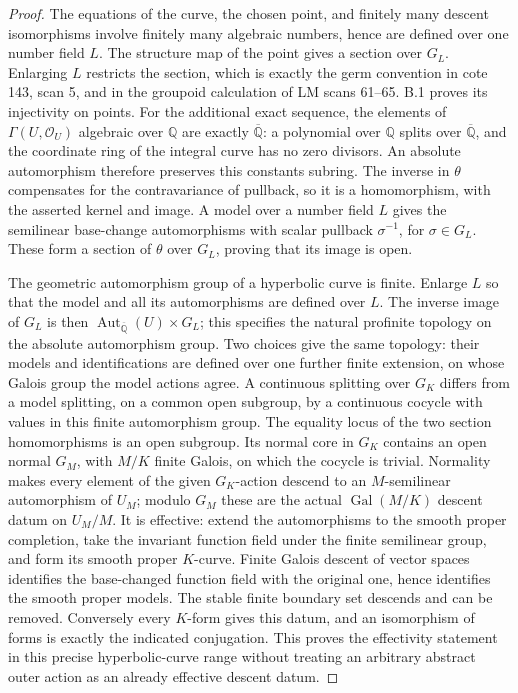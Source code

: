 \begin{proof}
The equations of the curve, the chosen point, and finitely many
descent isomorphisms involve finitely many algebraic numbers, hence
are defined over one number field $L$.  The structure map of the
point gives a section over $G_L$.  Enlarging $L$ restricts the
section, which is exactly the germ convention in cote 143, scan 5,
and in the groupoid calculation of LM scans 61--65.
B.1 proves its injectivity on points.
For the additional exact sequence, the elements of
$\Gamma(U,\mathcal O_U)$ algebraic over $\mathbb Q$ are exactly
$\overline{\mathbb Q}$: a polynomial over $\mathbb Q$ splits
over $\overline{\mathbb Q}$, and the coordinate ring of the
integral curve has no zero divisors. An absolute automorphism
therefore preserves this constants subring. The inverse in
$\theta$ compensates for the contravariance of pullback, so
it is a homomorphism, with the asserted kernel and image.
A model over a number field $L$ gives the semilinear
base-change automorphisms with scalar pullback $\sigma^{-1}$,
for $\sigma\in G_L$. These form a section of $\theta$ over
$G_L$, proving that its image is open.

The geometric automorphism group of a hyperbolic curve is
finite. Enlarge $L$ so that the model and all its automorphisms
are defined over $L$. The inverse image of $G_L$ is then
$\operatorname{Aut}_{\overline{\mathbb Q}}(U)\times G_L$;
this specifies the natural profinite topology on the
absolute automorphism group. Two choices give the same topology:
their models and identifications are defined over one further
finite extension, on whose Galois group the model actions agree.
A continuous splitting over
$G_K$ differs from a model splitting, on a common open
subgroup, by a continuous cocycle with values in this finite
automorphism group. The equality locus of the two section
homomorphisms is an open subgroup. Its normal core in $G_K$
contains an open normal $G_M$, with $M/K$ finite Galois,
on which the cocycle is trivial. Normality makes every element
of the given $G_K$-action descend to an $M$-semilinear
automorphism of $U_M$; modulo $G_M$ these are the actual
$\operatorname{Gal}(M/K)$ descent datum on $U_M/M$.
It is effective: extend the automorphisms to the smooth
proper completion, take the invariant function field under
the finite semilinear group, and form its smooth proper
$K$-curve. Finite Galois descent of vector spaces identifies
the base-changed function field with the original one, hence
identifies the smooth proper models. The stable finite
boundary set descends and can be removed. Conversely every
$K$-form gives this datum, and an isomorphism of forms is
exactly the indicated conjugation. This proves the
effectivity statement in this precise hyperbolic-curve
range without treating an arbitrary abstract outer action
as an already effective descent datum.


\end{proof}
